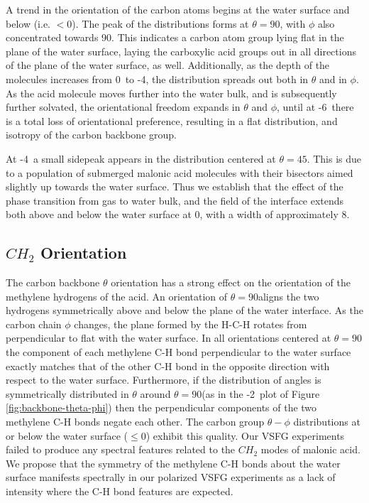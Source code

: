 A trend in the orientation of the carbon atoms begins at the water surface and below (i.e. $<0$\angs). The peak of the distributions forms at $\theta=90$\textdegree, with $\phi$ also concentrated towards 90\textdegree. This indicates a carbon atom group lying flat in the plane of the water surface, laying the carboxylic acid groups out in all directions of the plane of the water surface, as well. Additionally, as the depth of the molecules increases from 0\angs~to -4\angs, the distribution spreads out both in $\theta$ and in $\phi$. As the acid molecule moves further into the water bulk, and is subsequently further solvated, the orientational freedom expands in $\theta$ and $\phi$, until at -6\angs~there is a total loss of orientational preference, resulting in a flat distribution, and isotropy of the carbon backbone group.

At -4\angs~a small sidepeak appears in the distribution centered at $\theta=45$\textdegree. This is due to a population of submerged malonic acid molecules with their bisectors aimed slightly up towards the water surface. Thus we establish that the effect of the phase transition from gas to water bulk, and the field of the interface extends both above and below the water surface at 0\angs, with a width of approximately 8\angs.



\subsection {$CH_2$ Orientation}

The carbon backbone $\theta$ orientation has a strong effect on the orientation of the methylene hydrogens of the acid. An orientation of $\theta=90$\textdegree aligns the two hydrogens symmetrically above and below the plane of the water interface. As the carbon chain $\phi$ changes, the plane formed by the H-C-H rotates from perpendicular to flat with the water surface. In all orientations centered at $\theta=90$\textdegree the component of each methylene C-H bond perpendicular to the water surface exactly matches that of the other C-H bond in the opposite direction with respect to the water surface. Furthermore, if the distribution of angles is symmetrically distributed in $\theta$ around $\theta=90$\textdegree (as in the -2\angs~plot of Figure \ref{fig:backbone-theta-phi}) then the perpendicular components of the two methylene C-H bonds negate each other. The carbon group $\theta-\phi$ distributions at or below the water surface ($\le 0$\angs) exhibit this quality. Our VSFG experiments failed to produce any spectral features related to the $CH_2$ modes of malonic acid. We propose that the symmetry of the methylene C-H bonds about the water surface manifests spectrally in our polarized VSFG experiments as a lack of intensity where the C-H bond features are expected. 

